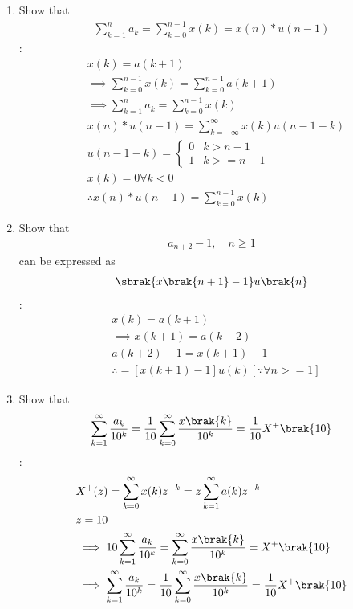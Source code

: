 \documentclass[journal,12pt,twocolumn]{IEEEtran}
\renewcommand\thesection{\arabic{section}}
\begin{document}
\begin{enumerate}[label=\thesection.\arabic*,ref=\thesection.\theenumi]
\item Show that 
\begin{align}
	\sum_{k=1}^{n}a_k = 
	\sum_{k=0}^{n-1}x(k) = x(n)*u(n-1)
\end{align}
\solution:
\begin{align}
& x(k)=a(k+1)\\
&\implies \sum_{k=0}^{n-1} x(k)=\sum_{k=0}^{n-1} a(k+1)\\
&\implies \sum_{k=1}^{n}a_{k} = \sum_{k=0}^{n-1}x(k)\\
& x(n)*u(n-1)=\sum_{k=-\infty}^{\infty} x(k) u(n-1-k)\\
&u(n-1-k)=\begin{cases}
	0 & k>n-1\\
	1 & k>=n-1
\end{cases}\\
&x(k)=0 \forall k<0\\
&\therefore x(n)*u(n-1)=\sum_{k=0}^{n-1} x(k)
\end{align}
\item Show that 
\begin{align}
a_{n+2}-1, \quad n \ge 1
\end{align}
can be expressed as 
\begin{align}
	\sbrak{x\brak{n+1}-1}u\brak{n}
\end{align}
\solution:
\begin{align}
&x(k)=a(k+1)\\
&\implies x(k+1)=a(k+2)\\
&a(k+2)-1=x(k+1)-1\\
&\therefore =[x(k+1)-1]u(k)[\because \forall n>=1]
\end{align}
 \item Show that 
\begin{align}
	\sum_{k=1}^{\infty}\frac{a_k}{10^k}= 
	\frac{1}{10}\sum_{k=0}^{\infty}\frac{x\brak{k}}{10^k} =\frac{1}{10}X^{+}\brak{{10}}
\end{align}
\solution:
\begin{align}
&X^{+}(z)=\sum_{k=0}^{\infty} x(k)z^{-k}=z\sum_{k=1}^{\infty} a(k) z^{-k}\\
&z=10\\
&\implies 10\sum_{k=1}^{\infty}\frac{a_k}{10^k}=\sum_{k=0}^{\infty}\frac{x\brak{k}}{10^k} =X^{+}\brak{{10}}\\
&\implies \sum_{k=1}^{\infty}\frac{a_k}{10^k}= 
	\frac{1}{10}\sum_{k=0}^{\infty}\frac{x\brak{k}}{10^k} =\frac{1}{10}X^{+}\brak{{10}}

\end{align}
\end{enumerate}
\end{document}
